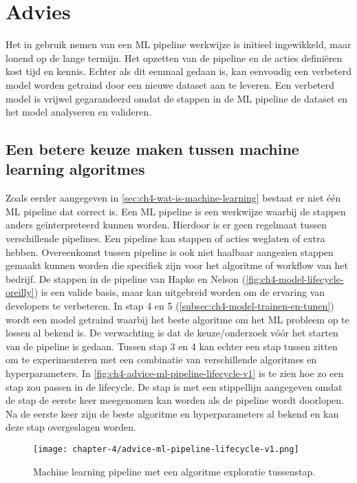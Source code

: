 \section{Advies}\label{sec:ch4-advies}
Het in gebruik nemen van een ML pipeline werkwijze is initieel ingewikkeld, maar lonend op de lange termijn. Het opzetten van de pipeline en de acties definiëren kost tijd en kennis. Echter als dit eenmaal gedaan is, kan eenvoudig een verbeterd model worden getraind door een nieuwe dataset aan te leveren. Een verbeterd model is vrijwel gegarandeerd omdat de stappen in de ML pipeline de dataset en het model analyseren en valideren.

\subsection{Een betere keuze maken tussen machine learning algoritmes}\label{subsec:ch4-een-betere-keuze-maken-tussen-machine-learning-algoritmes}
Zoals eerder aangegeven in \autoref{sec:ch4-wat-is-machine-learning} bestaat er niet één ML pipeline dat correct is. Een ML pipeline is een werkwijze waarbij de stappen anders geïnterpreteerd kunnen worden. Hierdoor is er geen regelmaat tussen verschillende pipelines. Een pipeline kan stappen of acties weglaten of extra hebben. Overeenkomst tussen pipeline is ook niet haalbaar aangezien stappen gemaakt kunnen worden die specifiek zijn voor het algoritme of workflow van het bedrijf. De stappen in de pipeline van Hapke en Nelson (\autoref{fig:ch4-model-lifecycle-oreilly}) is een valide basis, maar kan uitgebreid worden om de ervaring van developers te verbeteren. In stap 4 en 5 (\autoref{subsec:ch4-model-trainen-en-tunen}) wordt een model getraind waarbij het beste algoritme om het ML probleem op te lossen al bekend is. De verwachting is dat de keuze/onderzoek vóór het starten van de pipeline is gedaan. Tussen stap 3 en 4 kan echter een stap tussen zitten om te experimenteren met een combinatie van verschillende algoritmes en hyperparameters. In \autoref{fig:ch4-advice-ml-pipeline-lifecycle-v1} is te zien hoe zo een stap zou passen in de lifecycle. De stap is met een stippellijn aangegeven omdat de stap de eerste keer meegenomen kan worden als de pipeline wordt doorlopen. Na de eerste keer zijn de beste algoritme en hyperparameters al bekend en kan deze stap overgeslagen worden.

\begin{figure}[hbt!]
  \centering
  \texttt{[image: chapter-4/advice-ml-pipeline-lifecycle-v1.png]}
  \caption{Machine learning pipeline met een algoritme exploratie tussenstap.}
  \label{fig:ch4-advice-ml-pipeline-lifecycle-v1}
\end{figure}

